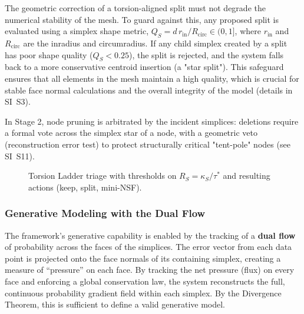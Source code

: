 \documentclass[11pt]{article}
\begin{document}
The geometric correction of a torsion-aligned split must not degrade the numerical stability of the mesh. To guard against this, any proposed split is evaluated using a simplex shape metric, $Q_S = d\,r_{\mathrm{in}}/R_{\mathrm{circ}} \in (0,1]$, where $r_{\mathrm{in}}$ and $R_{\mathrm{circ}}$ are the inradius and circumradius. If any child simplex created by a split has poor shape quality ($Q_S < 0.25$), the split is rejected, and the system falls back to a more conservative centroid insertion (a "star split"). This safeguard ensures that all elements in the mesh maintain a high quality, which is crucial for stable face normal calculations and the overall integrity of the model (details in SI~S3).

In Stage 2, node pruning is arbitrated by the incident simplices: deletions require a formal vote across the simplex star of a node, with a geometric veto (reconstruction error test) to protect structurally critical "tent-pole" nodes (see SI~S11).

\begin{figure}[t]
    \centering
    \caption{Torsion Ladder triage with thresholds on $R_S = \kappa_S/\tau^*$ and resulting actions (keep, split, mini-NSF).}
    \label{fig:ladder}
\end{figure}

\subsubsection{Generative Modeling with the Dual Flow}
The framework's generative capability is enabled by the tracking of a \textbf{dual flow} of probability across the faces of the simplices. The error vector from each data point is projected onto the face normals of its containing simplex, creating a measure of ``pressure'' on each face. By tracking the net pressure (flux) on every face and enforcing a global conservation law, the system reconstructs the full, continuous probability gradient field within each simplex. By the Divergence Theorem, this is sufficient to define a valid generative model.
\end{document}
